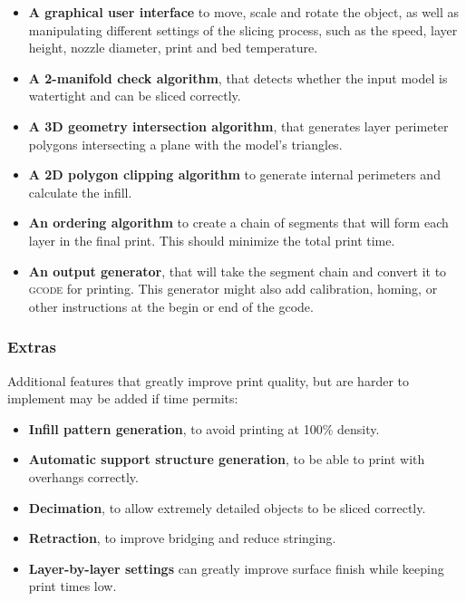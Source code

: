 \begin{itemize}
    \item \textbf{A graphical user interface} to move, scale and rotate the object, as well as manipulating different settings of the slicing process, such as the speed, layer height, nozzle diameter, print and bed temperature.
    \item \textbf{A 2-manifold \cite{wiki:2-manifold} check algorithm}, that detects whether the input model is watertight and can be sliced correctly.
    \item \textbf{A 3D geometry intersection algorithm}, that generates layer perimeter polygons intersecting a plane with the model's triangles.
    \item \textbf{A 2D polygon clipping algorithm} to generate internal perimeters and calculate the infill.
    \item \textbf{An ordering algorithm} to create a chain of segments that will form each layer in the final print. This should minimize the total print time.
    \item \textbf{An output  generator}, that will take the segment chain and convert it to \textsc{gcode} for printing. This generator might also add calibration, homing, or other instructions at the begin or end of the gcode.
\end{itemize}

\subsubsection{Extras}

Additional features that greatly improve print quality, but are harder to implement may be added if time permits:

\begin{itemize}
    \item \textbf{Infill pattern generation}, to avoid printing at 100\% density.
    \item \textbf{Automatic support structure generation}, to be able to print with overhangs correctly.
    \item \textbf{Decimation}, to allow extremely detailed objects to be sliced correctly.
    \item \textbf{Retraction}, to improve bridging and reduce stringing.
    \item \textbf{Layer-by-layer settings} can greatly improve surface finish while keeping print times low.
\end{itemize}


